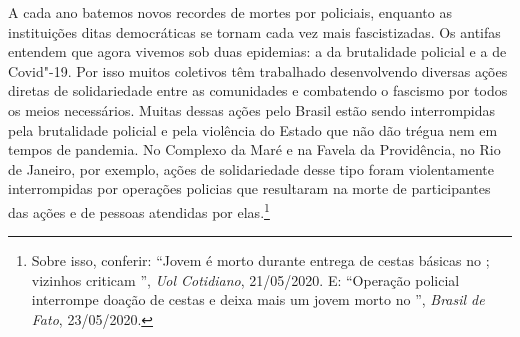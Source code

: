 A cada ano batemos novos recordes de mortes por policiais, enquanto as
instituições ditas democráticas se tornam cada vez mais fascistizadas.
Os antifas entendem que agora vivemos sob duas epidemias: a da
brutalidade policial e a de Covid"-19. Por isso muitos coletivos têm
trabalhado desenvolvendo diversas ações diretas de solidariedade entre
as comunidades e combatendo o fascismo por todos os meios necessários.
Muitas dessas ações pelo Brasil estão sendo interrompidas pela
brutalidade policial e pela violência do Estado que não dão trégua nem em
tempos de pandemia. No Complexo da Maré e na Favela da Providência, no
Rio de Janeiro, por exemplo, ações de solidariedade desse tipo foram
violentamente interrompidas por operações policias que resultaram na
morte de participantes das ações e de pessoas atendidas por
elas.\footnote{Sobre isso, conferir:
  ``Jovem é morto durante entrega de cestas básicas no ; vizinhos criticam '', \emph{Uol Cotidiano}, 21/05/2020.
  E: ``Operação policial interrompe doação de cestas e deixa mais um jovem morto no '', \emph{Brasil de Fato}, 23/05/2020.}

